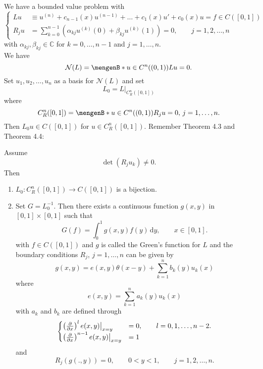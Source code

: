 

We have a bounded value problem with
\[
	\begin{cases}
		Lu &\equiv u^{(n)}+ c_{n-1}(x) u^{(n-1)} + \dots + c_1(x) u' + c_0(x)u= f \in C([0,1]) \\
		R_ju &= \sum_{k=0}^{n-1}\left( \alpha_{kj} u^{(k)}(0) + \beta_{kj}u^{(k)}(1) \right) = 0, \qquad j = 1,2,\dots,n
	\end{cases}
\]
with $\alpha_{kj}, \beta_{kj} \in \mathbb{C}$ for $k=0, \dots,n-1$ and $j =1,\dots,n$. \\
We have
\[
	\mathcal{N}(L) = \set[u \in C^n((0,1))]{Lu =0}.
\]
Set $u_1,u_2, \dots,u_n$ as a basis for $\mathcal{N}(L)$ and set
\[
	L_0 = L  \big|_{C_R^n([0,1])}^{}
\]
where
\[
	C_R^n([0,1]) = \set[u \in C^n((0,1))]{R_ju=0,\,j=1, \dots,n}.
\]
Then $L_0 u \in C([0,1])$ for $u \in C_R^n([0,1])$. Remember Theorem 4.3 and Theorem 4.4:
\begin{theorem*}
	Assume
	\[
		\det(R_ju_k) \neq 0.
	\]
	Then
	\begin{enumerate}
		\item $L_0: C_R^n([0,1]) \to  C([0,1])$ is a bijection.
		\item Set $G = L_0^{-1}$. Then there exists a continuous function $g(x,y)$ in $[0,1] \times [0,1]$ such that 
		\[
			G(f) = \int_{0}^{1}g(x,y)f(y) \,\mathrm{d}y, \qquad x \in [0,1].
		\]
		with $f \in C([0,1])$ and $g$ is called the Green's function for $L$ and the boundary conditions $R_j$, $j =1, \dots,n$ can be given by
		\[
			g(x,y) = e(x,y) \theta(x-y) + \sum_{k=1}^{n}b_k(y) u_k(x)
		\]
		where
		\[
			e(x,y) = \sum_{k=1}^{n}a_k(y)u_k(x)
		\]
		with $a_k$ and $b_k$ are defined through
		\[
			\begin{cases}
				\left( \frac{{\partial }}{{\partial x}}  \right)^l e(x,y)  \big|_{x=y}^{} &= 0, \qquad l=0,1,\dots,n-2. \\
				\left( \frac{{\partial }}{{\partial x}}  \right)^{n-1} e(x,y)  \big|_{x=y}^{} &= 1
			\end{cases}
		\]	
		and \[
			R_j(g(.,y))= 0, \qquad 0<y<1, \qquad j=1,2,\dots,n.
		\]
 	\end{enumerate}
\end{theorem*}
